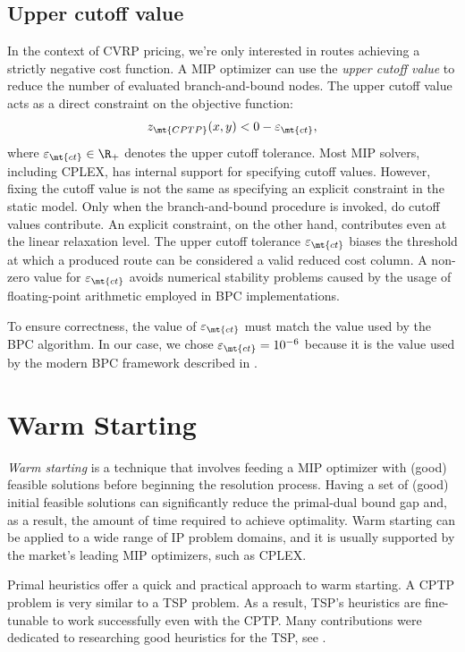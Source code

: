 \subsection{Upper cutoff value}
\label{sec:impl-upper-cutoff-value}

In the context of CVRP pricing, we're only interested in routes achieving a strictly negative cost function.
A MIP optimizer can use the \textit{upper cutoff value} to reduce the number of evaluated branch-and-bound nodes.
The upper cutoff value acts as a direct constraint on the objective function:
\begin{equation}
	z_\mt{CPTP}(x, y) < 0 - \varepsilon_{\mt{ct}},
\end{equation}
where $\varepsilon_{\mt{ct}} \in \R_+$ denotes the upper cutoff tolerance.
Most MIP solvers, including CPLEX, has internal support for specifying cutoff values.
However, fixing the cutoff value is not the same as specifying an explicit constraint in the static model.
Only when the branch-and-bound procedure is invoked, do cutoff values contribute.
An explicit constraint, on the other hand, contributes even at the linear relaxation level.
The upper cutoff tolerance $\varepsilon_{\mt{ct}}$ biases the threshold at which a produced route
can be considered a valid reduced cost column.
A non-zero value for $\varepsilon_{\mt{ct}}$ avoids numerical
stability problems caused by the usage of floating-point arithmetic
employed in BPC implementations.

To ensure correctness, the value of $\varepsilon_{\mt{ct}}$ must match the value used by the BPC algorithm.
In our case, we chose $\varepsilon_{\mt{ct}} = 10^{-6}$ because it is the value used by the modern BPC framework described in \textcite{sadykov2021}.

\section{Warm Starting}
\label{sec:impl-warm-starting}

\textit{Warm starting} is a technique that involves feeding
a MIP optimizer with (good) feasible solutions
before beginning the resolution process.
Having a set of (good) initial feasible solutions
can significantly reduce the primal-dual bound gap and,
as a result, the amount of time required to achieve optimality.
Warm starting can be applied to a wide range of IP problem domains,
and it is usually supported by the market's leading MIP optimizers,
such as CPLEX.

Primal heuristics offer a quick and practical approach to warm starting.
A CPTP problem is very similar to a TSP problem.
As a result, TSP's heuristics are fine-tunable to work successfully even with the CPTP.
Many contributions were dedicated to researching good heuristics for the TSP,
see \cite{rosenkrantz1977, johnson1997, laporte1992, johnson2007, hoffman2013}.


